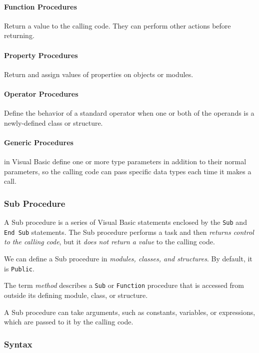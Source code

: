\paragraph*{Function Procedures}
Return a value to the calling code. They can perform other actions before returning.



\paragraph*{Property Procedures}
Return and assign values of properties on objects or modules.

\paragraph*{Operator Procedures}
Define the behavior of a standard operator when one or both of the operands is a newly-defined class or structure.

\paragraph*{Generic Procedures} in Visual Basic define one or more type parameters in addition to their normal parameters, so the calling code can pass specific data types each time it makes a call.


\subsubsection*{Sub Procedure}
A Sub procedure is a series of Visual Basic statements enclosed by the \texttt{Sub} and \texttt{End Sub} statements. The Sub procedure performs a task and then \textit{returns control to the calling code}, but it \textit{does not return a value} to the calling code.

We can define a Sub procedure in \textit{modules, classes, and structures}. By default, it is \texttt{Public}.

The term \textit{method} describes a \texttt{Sub} or \texttt{Function} procedure that is accessed from outside its defining module, class, or structure.

A Sub procedure can take arguments, such as constants, variables, or expressions, which are passed to it by the calling code.

\subsubsection*{Syntax}


